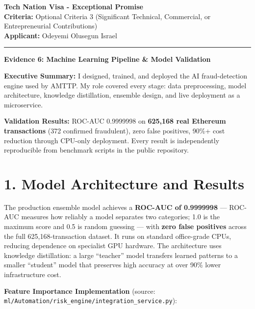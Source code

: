 \documentclass[11pt,a4paper]{article}
\begin{document}
\noindent\textbf{\Large Tech Nation Visa - Exceptional Promise}\\
\noindent\textbf{Criteria:} Optional Criteria 3 (Significant Technical, Commercial, or Entrepreneurial Contributions)\\
\noindent\textbf{Applicant:} Odeyemi Olusegun Israel\\
\rule{\textwidth}{0.4pt}

\vspace{0.1cm}
\begin{center}
    \textbf{\large Evidence 6: Machine Learning Pipeline \& Model Validation}
\end{center}
\vspace{0.05cm}

\noindent\textbf{Executive Summary:} I designed, trained, and deployed the AI fraud-detection engine used by AMTTP. My role covered every stage: data preprocessing, model architecture, knowledge distillation, ensemble design, and live deployment as a microservice.

\noindent\textbf{Validation Results:} ROC-AUC 0.9999998 on \textbf{625,168 real Ethereum transactions} (372 confirmed fraudulent), zero false positives, 90\%+ cost reduction through CPU-only deployment. Every result is independently reproducible from benchmark scripts in the public repository.

\section*{1. Model Architecture and Results}
The production ensemble model achieves a \textbf{ROC-AUC of 0.9999998} --- ROC-AUC measures how reliably a model separates two categories; 1.0 is the maximum score and 0.5 is random guessing --- with \textbf{zero false positives} across the full 625,168-transaction dataset. It runs on standard office-grade CPUs, reducing dependence on specialist GPU hardware. The architecture uses knowledge distillation: a large ``teacher'' model transfers learned patterns to a smaller ``student'' model that preserves high accuracy at over 90\% lower infrastructure cost.

\vspace{0.3cm}
\noindent\textbf{Feature Importance Implementation} (source: \texttt{ml/Automation/risk\_engine/integration\_service.py}):
\end{document}
